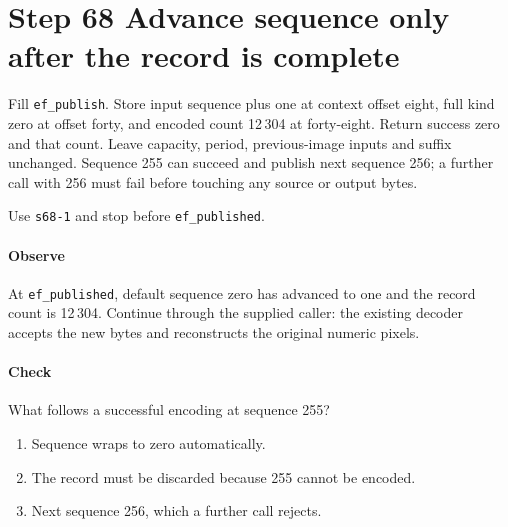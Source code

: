 \section{Step 68 Advance sequence only after the record is complete}
Fill \texttt{ef\_publish}. Store input sequence plus one at context offset eight, full kind zero at offset forty, and encoded count 12\,304 at forty-eight. Return success zero and that count. Leave capacity, period, previous-image inputs and suffix unchanged. Sequence 255 can succeed and publish next sequence 256; a further call with 256 must fail before touching any source or output bytes.

Use \texttt{s68-1} and stop before \texttt{ef\_published}.

\paragraph{Observe} At \texttt{ef\_published}, default sequence zero has advanced to one and the record count is 12\,304. Continue through the supplied caller: the existing decoder accepts the new bytes and reconstructs the original numeric pixels.

\paragraph{Check} What follows a successful encoding at sequence 255?
\begin{enumerate}[label=\Alph*.]
  \item Sequence wraps to zero automatically.
  \item The record must be discarded because 255 cannot be encoded.
  \item Next sequence 256, which a further call rejects.
\end{enumerate}
